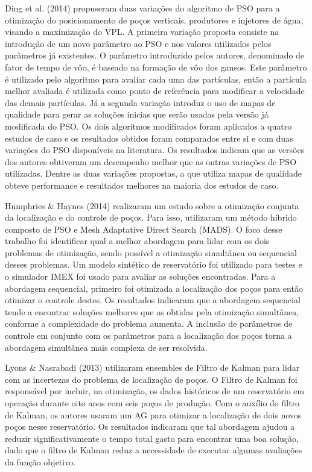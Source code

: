 Ding et al. (2014) propuseram duas variações do algoritmo de PSO para a otimização do posicionamento de poços verticais, produtores e injetores de água, visando a maximização do VPL. A primeira variação proposta consiste na introdução de um novo parâmetro ao PSO e nos valores utilizados pelos parâmetros já existentes. O parâmetro introduzido pelos autores, denominado de fator de tempo de vôo, é baseado na formação de vôo dos gansos. Este parâmetro é utilizado pelo algoritmo para avaliar cada uma das partículas, então a partícula melhor avaliada é utilizada como ponto de referência para modificar a velocidade das demais partículas. Já a segunda variação introduz o uso de mapas de qualidade para gerar as soluções inicias que serão usadas pela versão já modificada do PSO. Os dois algoritmos modificados foram aplicados a quatro estudos de caso e os resultados obtidos foram comparados entre si e com duas variações do PSO disponíveis na literatura. Os resultados indicam que as versões dos autores obtiveram um desempenho melhor que as outras variações de PSO utilizadas. Dentre as duas variações propostas, a que utiliza mapas de qualidade obteve performance e resultados melhores na maioria dos estudos de caso.

Humphries \& Haynes (2014) realizaram um estudo sobre a otimização conjunta da localização e do controle de poços. Para isso, utilizaram um método híbrido composto de PSO e Mesh Adaptative Direct Search (MADS). O foco desse trabalho foi identificar qual a melhor abordagem para lidar com os dois problemas de otimização, sendo possível a otimização simultânea ou sequencial desses problemas. Um modelo sintético de reservatório foi utilizado para testes e o simulador IMEX foi usado para avaliar as soluções encontradas. Para a abordagem sequencial, primeiro foi otimizada a localização dos poços para então otimizar o controle destes. Os resultados indicaram que a abordagem sequencial tende a encontrar soluções melhores que as obtidas pela otimização simultânea, conforme a complexidade do problema aumenta. A inclusão de parâmetros de controle em conjunto com os parâmetros para a localização dos poços torna a abordagem simultânea mais complexa de ser resolvida.

Lyons \& Nasrabadi (2013) utilizaram ensembles de Filtro de Kalman para lidar com as incertezas do problema de localização de poços. O Filtro de Kalman foi responsável por incluir, na otimização, os dados históricos de um reservatório em operação durante oito anos com seis poços de produção. Com o auxílio do filtro de Kalman, os autores usaram um AG para otimizar a localização de dois novos poços nesse reservatório. Os resultados indicaram que tal abordagem ajudou a reduzir significativamente o tempo total gasto para encontrar uma boa solução, dado que o filtro de Kalman reduz a necessidade de executar algumas avaliações da função objetivo.


